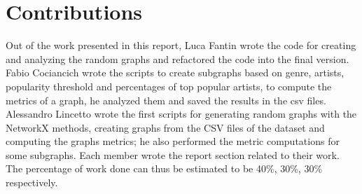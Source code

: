 \section*{Contributions}

Out of the work presented in this report, Luca Fantin wrote the code for creating and analyzing the random graphs and refactored the code into the final version.
Fabio Cociancich wrote the scripts to create subgraphs based on genre, artists, popularity threshold and percentages of top popular artists, to compute the metrics of a graph, he analyzed them and saved the results in the csv files.
Alessandro Lincetto wrote the first scripts for generating random graphs with the NetworkX methods, creating graphs from the CSV files of the dataset and computing the graphs metrics; he also performed the metric computations for some subgraphs.
Each member wrote the report section related to their work.
The percentage of work done can thus be estimated to be 40\%, 30\%, 30\% respectively.